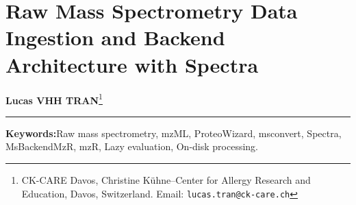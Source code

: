 \documentclass[11pt,twoside,openright]{book}
\begin{document}
\setcounter{chapter}{4}
\chapter{Raw Mass Spectrometry Data Ingestion and Backend Architecture with Spectra}
\label{chap:raw_data_ingestion}

\noindent
\textbf{Lucas VHH TRAN}\footnote{CK-CARE Davos, Christine K\"uhne--Center for Allergy Research and Education, Davos, Switzerland. Email: \texttt{lucas.tran@ck-care.ch}}\\
\rule{\textwidth}{0.8pt}

\begin{abstract}
\noindent
Raw mass spectrometry data files must be parsed accurately before downstream identification, feature extraction, or quantification can occur. Proprietary vendor file formats store spectral arrays in closed binary containers that restrict cross-platform computing and require specialized converter engines. The HUPO Proteomics Standards Initiative established open XML schemas (\texttt{mzML}) and controlled vocabularies (\texttt{PSI-MS}) to standardize scan-level metadata and binary peak representations \cite{martens2011mzml, deutsch2010psi}. In R 4.6.1 and Bioconductor 3.20 \cite{gentleman2004bioconductor, huber2015orchestrating}, the \texttt{mzR} package provides low-level C++ file handles via Rcpp \cite{eddelbuettel2011rcpp} and ProteoWizard \cite{chambers2012proteowizard} that read headers on-demand without memory overhead. The modern \texttt{Spectra} container builds on this architecture \cite{gatto2021spectra, rainer2022msexperiment}, offering a modular backend system that separates data manipulation logic from physical storage. Using on-disk backends (\texttt{MsBackendMzR} or \texttt{MsBackendHdf5Peaks} \cite{bhamber2021mzmlb, fischer2020rhdf5}), large analytical cohorts can be manipulated with minimal RAM footprints, preserving FAIR principles \cite{wilkinson2016fair, deutsch2020pride} and avoiding out-of-memory crashes while enabling lazy execution queues for peak cleaning and extraction. This chapter details the physical architecture of mass spectrometry files, the mechanics of centroiding conversion via ProteoWizard \texttt{msconvert} \cite{chambers2012proteowizard, hulstaert2020thermorawfileparser}, low-level handle seeking in \texttt{mzR}, and high-level stream processing in \texttt{Spectra}.
\end{abstract}

\vspace{1em}
\noindent\textbf{Keywords:}\enspace Raw mass spectrometry, mzML, ProteoWizard, msconvert, Spectra, MsBackendMzR, mzR, Lazy evaluation, On-disk processing.
\end{document}
